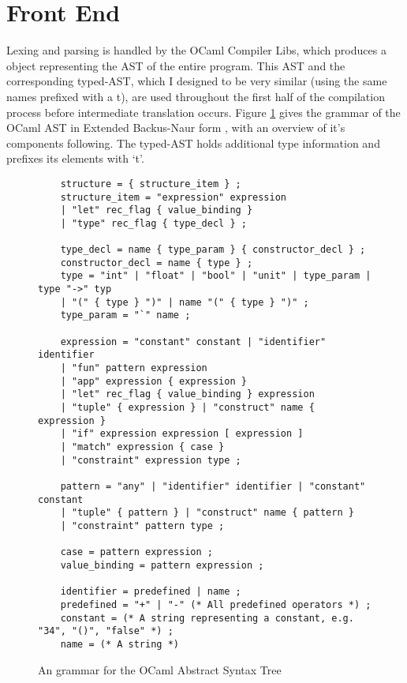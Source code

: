 \section{Front End}
Lexing and parsing is handled by the OCaml Compiler Libs, which produces a  object representing the AST of the entire program. This AST and the corresponding typed-AST, which I designed to be very similar (using the same names prefixed with a t), are used throughout the first half of the compilation process before intermediate translation occurs. Figure \ref{fig:ast} gives the grammar of the OCaml AST in Extended Backus-Naur form \cite{Ebnf}, with an overview of it's components following. The typed-AST holds additional type information and prefixes its elements with `t'.
\begin{figure}[h!]
    \begin{verbatim}
    structure = { structure_item } ;
    structure_item = "expression" expression
    | "let" rec_flag { value_binding }
    | "type" rec_flag { type_decl } ;
    
    type_decl = name { type_param } { constructor_decl } ;
    constructor_decl = name { type } ;
    type = "int" | "float" | "bool" | "unit" | type_param | type "->" typ
    | "(" { type } ")" | name "(" { type } ")" ;
    type_param = "`" name ;
    
    expression = "constant" constant | "identifier" identifier
    | "fun" pattern expression
    | "app" expression { expression }
    | "let" rec_flag { value_binding } expression
    | "tuple" { expression } | "construct" name { expression }
    | "if" expression expression [ expression ]
    | "match" expression { case }
    | "constraint" expression type ;
    
    pattern = "any" | "identifier" identifier | "constant" constant
    | "tuple" { pattern } | "construct" name { pattern }
    | "constraint" pattern type ;
    
    case = pattern expression ;
    value_binding = pattern expression ;
    
    identifier = predefined | name ;
    predefined = "+" | "-" (* All predefined operators *) ;
    constant = (* A string representing a constant, e.g. "34", "()", "false" *) ;
    name = (* A string *)
    \end{verbatim}
    \caption{An grammar for the OCaml Abstract Syntax Tree}
    \label{fig:ast}
\end{figure}
